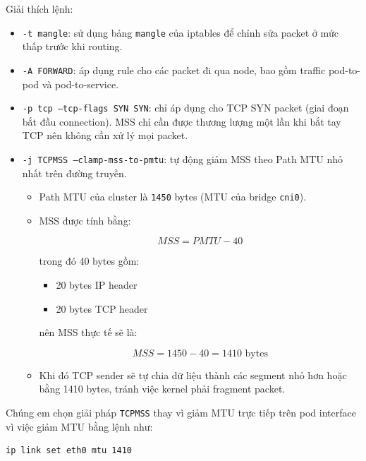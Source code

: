 Giải thích lệnh:
\begin{itemize}
    \item \texttt{-t mangle}: sử dụng bảng \texttt{mangle} của iptables để chỉnh sửa packet ở mức thấp trước khi routing.
    
    \item \texttt{-A FORWARD}: áp dụng rule cho các packet đi qua node, bao gồm traffic pod-to-pod và pod-to-service.
    
    \item \texttt{-p tcp --tcp-flags SYN SYN}: chỉ áp dụng cho TCP SYN packet (giai đoạn bắt đầu connection). MSS chỉ cần được thương lượng một lần khi bắt tay TCP nên không cần xử lý mọi packet.
    
    \item \texttt{-j TCPMSS --clamp-mss-to-pmtu}: tự động giảm MSS theo Path MTU nhỏ nhất trên đường truyền.
    
    \begin{itemize}
        \item Path MTU của cluster là \texttt{1450} bytes (MTU của bridge \texttt{cni0}).
        
        \item MSS được tính bằng:
        
        \[
        MSS = PMTU - 40
        \]
        
        trong đó 40 bytes gồm:
        
        \begin{itemize}
            \item 20 bytes IP header
            \item 20 bytes TCP header
        \end{itemize}
        
        nên MSS thực tế sẽ là:
        
        \[
        MSS = 1450 - 40 = 1410 \text{ bytes}
        \]
        
        \item Khi đó TCP sender sẽ tự chia dữ liệu thành các segment nhỏ hơn hoặc bằng 1410 bytes, tránh việc kernel phải fragment packet.
    \end{itemize}
\end{itemize}

Chúng em chọn giải pháp \texttt{TCPMSS} thay vì giảm MTU trực tiếp trên pod interface vì việc giảm MTU bằng lệnh như:

\begin{verbatim}
ip link set eth0 mtu 1410
\end{verbatim}

